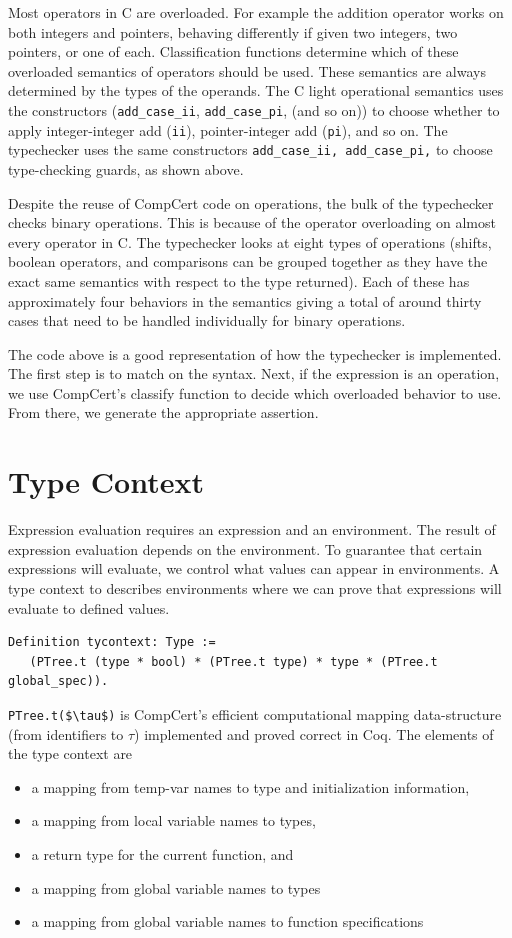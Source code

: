 \documentclass{puthesis}
\begin{document}
Most operators in C are overloaded. For example the addition operator
works on both integers and pointers, behaving differently if given two
integers, two pointers, or one of each. 
Classification functions determine which of these overloaded semantics
of operators should be used. These semantics are always determined by the types
of the operands. 
The C light operational semantics uses
the constructors (\lstinline|add_case_ii|, \lstinline|add_case_pi|, (and so on))
to choose whether to apply integer-integer add (\lstinline|ii|),
pointer-integer add (\lstinline|pi|), and so on.
The typechecker uses the same constructors
\lstinline{add_case_ii, add_case_pi,} to choose
type-checking guards, as shown above.

Despite the reuse of CompCert code on operations, the bulk of the
typechecker checks binary operations. This is because of the operator
overloading on almost every operator in C. The typechecker looks at
eight types of operations (shifts, boolean operators, and comparisons
can be grouped together as they have the exact same semantics with
respect to the type returned). Each of these has approximately four
behaviors in the semantics giving a total of around thirty cases that
need to be handled individually for binary operations.
 
The code above is a good representation of how the typechecker is
implemented. The first step is to match on the syntax. Next, if the expression
is an operation, we use CompCert's classify function to decide which overloaded
behavior to use. From there, we generate the appropriate assertion. 

\section{Type Context}
\label{sec:context}

Expression evaluation requires an expression and an environment.  The
result of expression evaluation depends on the environment. To
guarantee that certain expressions will evaluate, we control what
values can appear in environments. A type context to describes
environments where we can prove that expressions will evaluate to
defined values.

\begin{lstlisting}
Definition tycontext: Type :=
   (PTree.t (type * bool) * (PTree.t type) * type * (PTree.t global_spec)).
\end{lstlisting}
\lstinline|PTree.t($\tau$)| is CompCert's efficient computational 
mapping data-structure
(from identifiers to $\tau$) implemented
and proved correct in Coq.  
The elements of the type context are
\begin{itemize}
  \item a mapping from temp-var names to type and initialization
  information,
  \item a mapping from local variable names to types,
  \item a return type for the current function, and
  \item a mapping from global variable names to types
  \item a mapping from global variable names to function specifications
\end{itemize}
\end{document}
